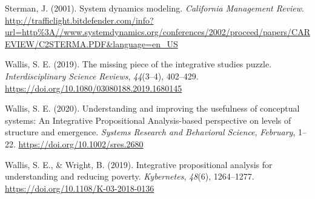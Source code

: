 \documentclass[
]{book}
\begin{document}
Sterman, J. (2001). System dynamics modeling. \emph{California Management Review}. \url{http://trafficlight.bitdefender.com/info?url=http\%3A//www.systemdynamics.org/conferences/2002/proceed/papers/CAREVIEW/C2STERMA.PDF\&language=en_US}

Wallis, S. E. (2019). The missing piece of the integrative studies puzzle. \emph{Interdisciplinary Science Reviews}, \emph{44}(3--4), 402--429. \url{https://doi.org/10.1080/03080188.2019.1680145}

Wallis, S. E. (2020). Understanding and improving the usefulness of conceptual systems: An Integrative Propositional Analysis-based perspective on levels of structure and emergence. \emph{Systems Research and Behavioral Science}, \emph{February}, 1--22. \url{https://doi.org/10.1002/sres.2680}

Wallis, S. E., \& Wright, B. (2019). Integrative propositional analysis for understanding and reducing poverty. \emph{Kybernetes}, \emph{48}(6), 1264--1277. \url{https://doi.org/10.1108/K-03-2018-0136}

  
\end{document}

